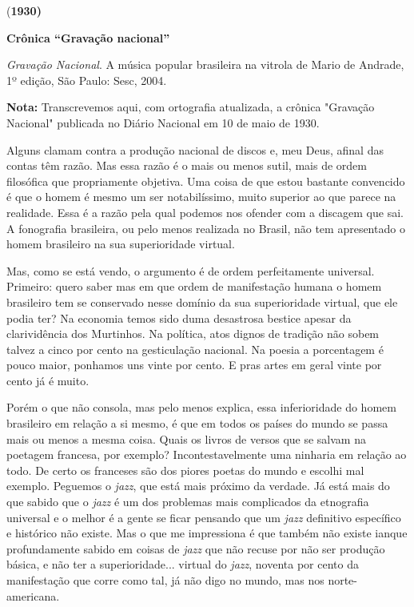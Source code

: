 (\textbf{1930)}

\textbf{Crônica ``Gravação nacional''}

\emph{Gravação Nacional}. A música popular brasileira na vitrola de
Mario de Andrade, 1º edição, São Paulo: Sesc, 2004.

\textbf{Nota:} Transcrevemos aqui, com ortografia atualizada, a crônica
"Gravação Nacional" publicada no Diário Nacional em 10 de maio de 1930.

Alguns clamam contra a produção nacional de discos e, meu Deus, afinal
das contas têm razão. Mas essa razão é o mais ou menos sutil, mais de
ordem filosófica que propriamente objetiva. Uma coisa de que estou
bastante convencido é que o homem é mesmo um ser notabilíssimo, muito
superior ao que parece na realidade. Essa é a razão pela qual podemos
nos ofender com a discagem que sai. A fonografia brasileira, ou pelo
menos realizada no Brasil, não tem apresentado o homem brasileiro na sua
superioridade virtual.

Mas, como se está vendo, o argumento é de ordem perfeitamente universal.
Primeiro: quero saber mas em que ordem de manifestação humana o homem
brasileiro tem se conservado nesse domínio da sua superioridade virtual,
que ele podia ter? Na economia temos sido duma desastrosa bestice apesar
da clarividência dos Murtinhos. Na política, atos dignos de tradição não
sobem talvez a cinco por cento na gesticulação nacional. Na poesia a
porcentagem é pouco maior, ponhamos uns vinte por cento. E pras artes em
geral vinte por cento já é muito.

Porém o que não consola, mas pelo menos explica, essa inferioridade do
homem brasileiro em relação a si mesmo, é que em todos os países do
mundo se passa mais ou menos a mesma coisa. Quais os livros de versos
que se salvam na poetagem francesa, por exemplo? Incontestavelmente uma
ninharia em relação ao todo. De certo os franceses são dos piores poetas
do mundo e escolhi mal exemplo. Peguemos o \emph{jazz}, que está mais
próximo da verdade. Já está mais do que sabido que o \emph{jazz} é um
dos problemas mais complicados da etnografia universal e o melhor é a
gente se ficar pensando que um \emph{jazz} definitivo específico e
histórico não existe. Mas o que me impressiona é que também não existe
ianque profundamente sabido em coisas de \emph{jazz} que não recuse por
não ser produção básica, e não ter a superioridade... virtual do
\emph{jazz}, noventa por cento da manifestação que corre como tal, já
não digo no mundo, mas nos norte-americana.

